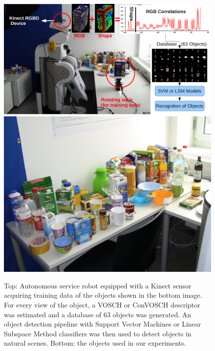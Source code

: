 \documentclass[a4paper, 10 pt, conference]{sty/ieeeconf}
\begin{document}
\begin{figure}[tb!]
  \begin{center}
    \includegraphics[width=.99\columnwidth]{figures/firstpage/firstpage.pdf}
    \includegraphics[width=.99\columnwidth]{figures/objects/objects.jpg}
    \caption{Top: Autonomous service robot equipped with a Kinect sensor
    acquiring training data of the objects shown in the bottom image. For 
  every view of the object, a VOSCH or ConVOSCH descriptor was estimated and a database
of 63 objects was generated. An object detection pipeline with Support Vector
Machines or Linear Subspace Method classifiers was then used to detect objects
in natural scenes. Bottom: the objects used in our experiments.}
\vspace{-3ex}
    \label{fig:robot}
  \end{center}
\end{figure}
\end{document}
